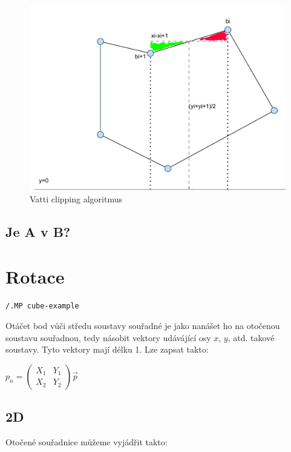 \documentclass[a4paper,12pt]{book}
\begin{document}
\begin{figure}[H]
  \centering
  \includegraphics[width=1\textwidth]{fig8.png}
  \caption{Vatti clipping algoritmus}
\end{figure}


\section{Je A v B?}




\chapter{Rotace}

\begin{lstlisting}
/.MP cube-example 
\end{lstlisting}

Otáčet bod vůči středu soustavy souřadné je jako nanášet ho na otočenou soustavu souřadnou, tedy násobit vektory udávájící osy $x$, $y$, atd. takové soustavy.
Tyto vektory mají délku 1. Lze zapsat takto:

$p_n = \begin{pmatrix}
X_1 & Y_1 \\
X_2 & Y_2
\end{pmatrix}\vec{p}$\\


\section{2D}

Otočené souřadnice můžeme vyjádřit takto:
\end{document}
